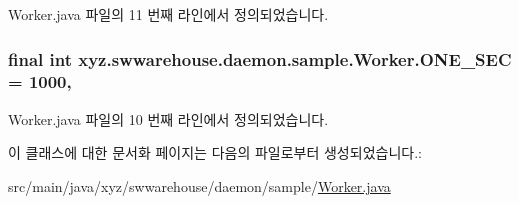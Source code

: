 Worker.\-java 파일의 11 번째 라인에서 정의되었습니다.

\hypertarget{classxyz_1_1swwarehouse_1_1daemon_1_1sample_1_1_worker_a285c9ea5eebf4bb083140ca18048961a}{
\subsubsection[{O\-N\-E\-\_\-\-S\-E\-C}]{\setlength{\rightskip}{0pt plus 5cm}final int xyz.\-swwarehouse.\-daemon.\-sample.\-Worker.\-O\-N\-E\-\_\-\-S\-E\-C = 1000\hspace{0.3cm}{\ttfamily [static]}, {\ttfamily [private]}}}\label{classxyz_1_1swwarehouse_1_1daemon_1_1sample_1_1_worker_a285c9ea5eebf4bb083140ca18048961a}


Worker.\-java 파일의 10 번째 라인에서 정의되었습니다.



이 클래스에 대한 문서화 페이지는 다음의 파일로부터 생성되었습니다.\-:\begin{DoxyCompactItemize}
\item 
src/main/java/xyz/swwarehouse/daemon/sample/\hyperlink{_worker_8java}{Worker.\-java}\end{DoxyCompactItemize}
